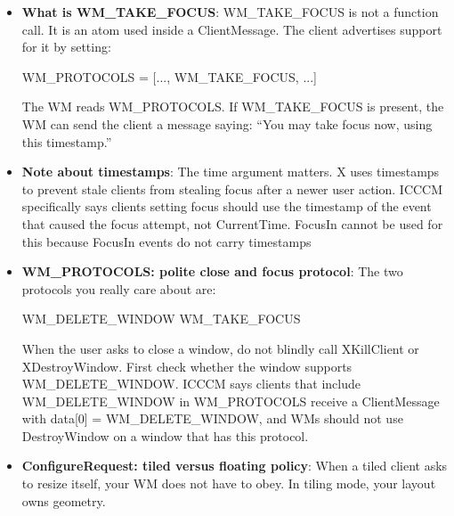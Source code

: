 \documentclass{report}
\begin{document}
\begin{itemize}
\begin{enumerate}
                    \bigbreak \noindent 
                    This is the most subtle model. The client wants keyboard input, but it does not want the WM to blindly set focus to its top-level window.
                    \bigbreak \noindent 
                    Instead, the WM should send WM\_TAKE\_FOCUS. The client then decides whether to accept focus and which internal window should receive it.
                    \bigbreak \noindent 
                    ICCCM says No Input and Globally Active clients set input = False, which requests that the WM not set input focus to their top-level window
            \end{enumerate}
        \item \textbf{What is WM\_TAKE\_FOCUS}: WM_TAKE_FOCUS is not a function call. It is an atom used inside a ClientMessage. The client advertises support for it by setting:
            \bigbreak \noindent 
            \begin{cppcode}
                WM_PROTOCOLS = [..., WM_TAKE_FOCUS, ...]
            \end{cppcode}
            \bigbreak \noindent 
            The WM reads WM\_PROTOCOLS. If WM\_TAKE\_FOCUS is present, the WM can send the client a message saying: “You may take focus now, using this timestamp.”
        \item \textbf{Note about timestamps}: The time argument matters. X uses timestamps to prevent stale clients from stealing focus after a newer user action. ICCCM specifically says clients setting focus should use the timestamp of the event that caused the focus attempt, not CurrentTime. FocusIn cannot be used for this because FocusIn events do not carry timestamps
        \item \textbf{WM\_PROTOCOLS: polite close and focus protocol}:  The two protocols you really care about are:
            \bigbreak \noindent 
            \begin{cppcode}
            WM_DELETE_WINDOW
            WM_TAKE_FOCUS
            \end{cppcode}
            \bigbreak \noindent 
            When the user asks to close a window, do not blindly call XKillClient or XDestroyWindow. First check whether the window supports WM\_DELETE\_WINDOW.
            \bigbreak \noindent 
            ICCCM says clients that include WM\_DELETE\_WINDOW in WM\_PROTOCOLS receive a ClientMessage with data[0] = WM\_DELETE\_WINDOW, and WMs should not use DestroyWindow on a window that has this protocol.
        \item \textbf{ConfigureRequest: tiled versus floating policy}: When a tiled client asks to resize itself, your WM does not have to obey. In tiling mode, your layout owns geometry.

\end{itemize}
\end{document}
